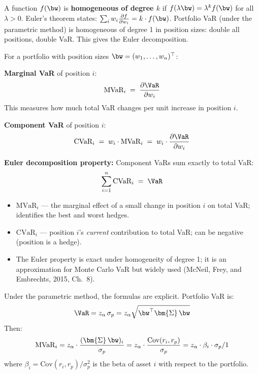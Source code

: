 \begin{prereq}
A function $f(\bw)$ is \textbf{homogeneous of degree $k$} if
$f(\lambda \bw) = \lambda^k f(\bw)$ for all $\lambda > 0$.
Euler's theorem states:
$\sum_i w_i \frac{\partial f}{\partial w_i} = k \cdot f(\bw)$.
Portfolio VaR (under the parametric method) is homogeneous of degree 1
in position sizes: double all positions, double VaR.  This gives the
Euler decomposition.
\end{prereq}

\begin{definition}
For a portfolio with position sizes $\bw = (w_1, \ldots, w_n)^\top$:

\textbf{Marginal VaR} of position $i$:
\begin{equation}
\label{eq:mvar}
\text{MVaR}_i \;=\; \frac{\partial \VaR}{\partial w_i}
\end{equation}
This measures how much total VaR changes per unit increase in position $i$.

\textbf{Component VaR} of position $i$:
\begin{equation}
\label{eq:cvar}
\text{CVaR}_i \;=\; w_i \cdot \text{MVaR}_i
  \;=\; w_i \cdot \frac{\partial \VaR}{\partial w_i}
\end{equation}

\textbf{Euler decomposition property:} Component VaRs sum exactly to
total VaR:
\begin{equation}
\label{eq:euler}
\sum_{i=1}^n \text{CVaR}_i \;=\; \VaR
\end{equation}
\begin{itemize}[nosep]
  \item $\text{MVaR}_i$ --- the marginal effect of a small change in
        position $i$ on total VaR; identifies the best and worst hedges.
  \item $\text{CVaR}_i$ --- position $i$'s \emph{current} contribution
        to total VaR; can be negative (position is a hedge).
  \item The Euler property is exact under homogeneity of degree 1;
        it is an approximation for Monte Carlo VaR but widely used
        (McNeil, Frey, and Embrechts, 2015, Ch.~8).
\end{itemize}
\end{definition}

Under the parametric method, the formulas are explicit.  Portfolio VaR is:
\[
  \VaR = z_\alpha \,\sigma_p
  = z_\alpha \sqrt{\bw^\top \bm{\Sigma}\, \bw}
\]
Then:
\begin{equation}
\label{eq:mvar-parametric}
\text{MVaR}_i = z_\alpha \cdot
  \frac{(\bm{\Sigma}\,\bw)_i}{\sigma_p}
  = z_\alpha \cdot \frac{\text{Cov}(r_i, r_p)}{\sigma_p}
  = z_\alpha \cdot \beta_i \cdot \sigma_p / 1
\end{equation}
where $\beta_i = \text{Cov}(r_i, r_p)/\sigma_p^2$ is the beta of
asset $i$ with respect to the portfolio.

